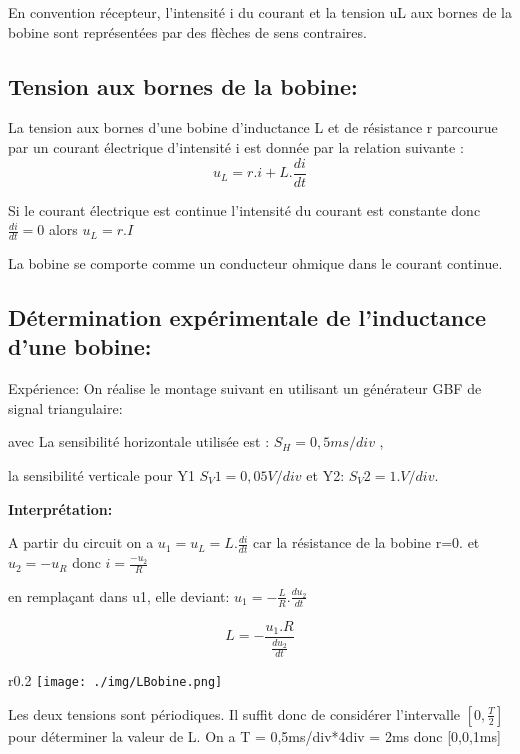 \documentclass[12pt]{article}
\begin{document}
En convention récepteur, l'intensité i du courant et la tension uL aux bornes de la bobine sont représentées par
des flèches de sens contraires.

\subsection{Tension aux bornes de la bobine: }
La tension aux bornes d'une bobine d'inductance L et de résistance r parcourue par un courant électrique d'intensité i est donnée par la relation suivante : 
$$u_L = r.i + L.\frac{di}{dt}$$

Si le courant électrique est continue l'intensité du courant est constante donc $\frac{di}{dt} = 0$  alors $u_L =r.I$

\begin{tcolorbox}
La bobine se comporte comme un conducteur ohmique dans le courant continue.
\end{tcolorbox}

\subsection{Détermination expérimentale de l'inductance d'une bobine: }

Expérience: On réalise le montage suivant en utilisant un générateur GBF de signal triangulaire:

avec La sensibilité horizontale utilisée est : $S_H = 0,5ms/ div$ , 

la sensibilité verticale pour Y1 $S_V1 =0,05V / div$ et Y2: $S_V2 = 1.V / div$.
\vspace{1cm}

\textbf{Interprétation:}

A partir du circuit on a $u_1 = u_L = L.\frac{di}{dt}$ car la résistance de la bobine r=0. et $u_2 = -u_R $ donc $i = \frac{-u_2}{R}$

en remplaçant dans u1, elle deviant: $u_1 = -\frac{L}{R}.\frac{du_2}{dt}$

$$L = -\frac{u_1.R}{\frac{du_2}{dt}}$$

\begin{wrapfigure}[1]{r}{0.2\textwidth}
	\vspace{-2cm}
	\texttt{[image: ./img/LBobine.png]}
\end{wrapfigure}


Les deux tensions sont périodiques. Il suffit donc de considérer l'intervalle $[0, \frac{T}{2}]$ pour déterminer la valeur de L. On a T = 0,5ms/div*4div = 2ms donc [0,0,1ms]
\end{document}
